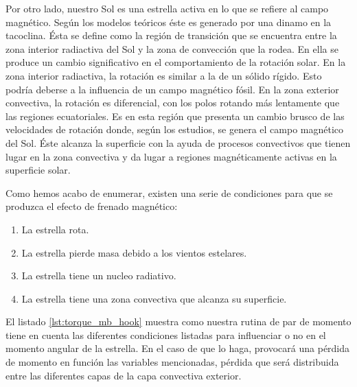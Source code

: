 Por otro lado, nuestro Sol es una estrella activa en lo que se refiere al campo magnético. Según los modelos teóricos éste es generado por una dinamo en la tacoclina. Ésta se define como la región de transición que se encuentra entre la zona interior radiactiva del Sol y la zona de convección que la rodea. En ella se produce un cambio significativo en el comportamiento de la rotación solar. En la zona interior radiactiva, la rotación es similar a la de un sólido rígido. Esto podría deberse a la influencia de un campo magnético fósil.
En la zona exterior convectiva, la rotación es diferencial, con los polos rotando más lentamente que las regiones ecuatoriales. Es en esta región que presenta un cambio brusco de las velocidades de rotación donde, según los estudios, se genera el campo magnético del Sol. Éste alcanza la superficie con la ayuda de procesos convectivos que tienen lugar en la zona convectiva y da lugar a regiones magnéticamente activas en la superficie solar.\par


Como hemos acabo de enumerar, existen una serie de condiciones para que se produzca el efecto de frenado magnético:

\begin{enumerate}
	\item La estrella rota.
	\item La estrella pierde masa debido a los vientos estelares.
	\item La estrella tiene un nucleo radiativo.
	\item La estrella tiene una zona convectiva que alcanza su superficie.
\end{enumerate}

El listado \ref{lst:torque_mb_hook} muestra como nuestra rutina de par de momento tiene en cuenta las diferentes condiciones listadas para influenciar o no en el momento angular de la estrella. En el caso de que lo haga, provocará una pérdida de momento en función las variables mencionadas, pérdida que será distribuida entre las diferentes capas de la capa convectiva exterior.

